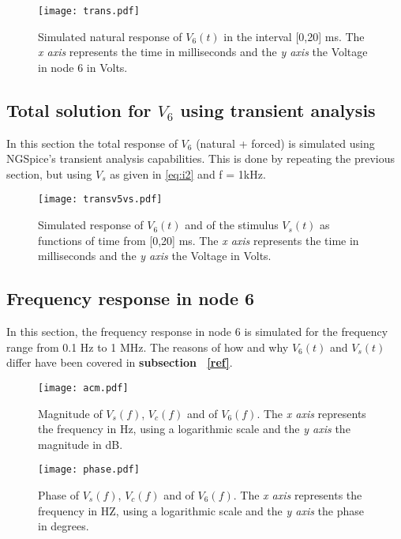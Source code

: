 \begin{figure}[H] \centering
\texttt{[image: trans.pdf]}
\caption{Simulated natural response of $V_6(t)$ in the interval [0,20] ms. The \textit{x axis} represents the time in milliseconds and the \textit{y axis} the Voltage in node 6  in Volts.  }
\label{fig:transient}
\end{figure}

\subsection{ Total solution for $V_6$ using transient analysis}

In this section the total response of $V_6$ (natural + forced) is simulated using NGSpice's transient analysis capabilities. This is done by repeating the previous section, but using {\it $V_s$} as given in \ref{eq:i2} and f = 1kHz.\par
\begin{figure}[H] \centering
\texttt{[image: transv5vs.pdf]}
\caption{Simulated response of $V_{6}(t)$ and of the stimulus $V_{s}(t)$ as functions of time from [0,20] ms. The \textit{x axis} represents the time in milliseconds and the \textit{y axis} the Voltage in Volts.}
\label{fig:resp_total}
\end{figure}

\pagebreak
\subsection{ Frequency response in node 6}
In this section, the frequency response in node 6 is simulated for the frequency range from 0.1 Hz to 1 MHz. 
The reasons of how and why $V_{6}(t)$ and $V_{s}(t)$ differ have been covered in \textbf{subsection ~\ref{ref}}.\par
\begin{figure}[H] \centering
\texttt{[image: acm.pdf]}
\caption{Magnitude of $V_s(f)$, $V_c(f)$  and of $V_6(f)$. The \textit{x axis} represents the frequency in Hz, using a logarithmic scale and the \textit{y axis} the magnitude in dB.}
\label{fig:Magnitude}
\end{figure}

\par
\begin{figure}[H] \centering
\texttt{[image: phase.pdf]}
\caption{Phase of $V_s(f)$, $V_c(f)$ and of $V_6(f)$. The \textit{x axis} represents the frequency in HZ, using a logarithmic scale and the \textit{y axis} the phase in degrees.}  
\label{fig:phase}
\end{figure}
\vspace{2cm}
\pagebreak